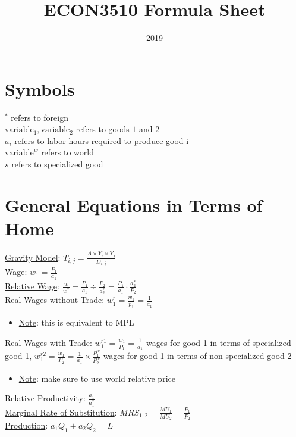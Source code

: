 \documentclass{article}
\title{ECON3510 Formula Sheet}
\date{2019}
\begin{document}
\maketitle

\section{Symbols}
$^{*}$ refers to foreign \\
$\text{variable}_{1},\text{variable}_{2}$ refers to goods $1$ and $2$ \\
$a_{i}$ refers to labor hours required to produce good i \\
$\text{variable}^{w}$ refers to world \\
$s$ refers to specialized good

\section{General Equations in Terms of Home}
\underline{Gravity Model}: $T_{i,j} = \frac{A \times Y_{i} \times Y_{j}}{D_{i,j}}$ \\
\underline{Wage}: $w_{1} = \frac{P_{1}}{a_{1}}$ \\
\underline{Relative Wage}: $\frac{w}{w^{*}} = \frac{P_{1}}{a_{1}} \div \frac{P_{2}}{a_{2}^{*}} = \frac{P_{1}}{a_{1}} \cdot  \frac{a_{2}^{*}}{P_{2}}$ \\
\underline{Real Wages without Trade}: $w_{1}^{r} = \frac{w_{1}}{p_{1}} = \frac{1}{a_{1}}$
\begin{itemize}
  \item  \underline{Note}: this is equivalent to MPL
\end{itemize}
\underline{Real Wages with Trade}: $w_{1}^{r1} = \frac{w_{1}}{P_{1}} = \frac{1}{a_{1}}$ wages for good 1 in terms of specialized good 1, $w_{1}^{r2} = \frac{w_{1}}{P_{2}} = \frac{1}{a_{1}} \times \frac{P_{1}^{w}}{P_{2}^{w}}$ wages for good 1 in terms of non-specialized good 2 \\
\begin{itemize}
  \item  \underline{Note}: make sure to use world relative price
\end{itemize}
\underline{Relative Productivity}: $\frac{a_{1}}{a_{1}^{*}}$ \\
\underline{Marginal Rate of Substitution}: $MRS_{1,2} = \frac{MU_{1}}{MU_{2}} = \frac{P_{1}}{P_{2}}$ \\
\underline{Production}: $a_{1}Q_{1} + a_{2}Q_{2} = L$ \\
\end{document}
